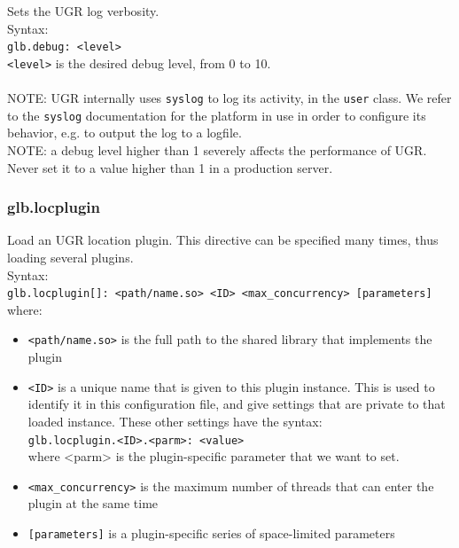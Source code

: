 \documentclass[12pt]{article} %
\begin{document}
 Sets the UGR log verbosity.\\
 
 Syntax:\\

\verb"glb.debug: <level>"\\

\verb"<level>" is the desired debug level, from 0 to 10.\\ \\
 NOTE: UGR internally uses \verb"syslog" to log its activity, in the \verb"user" class. We refer to the \verb"syslog" documentation for the platform in use in order to configure its behavior, e.g. to output the log to a logfile.\\
 
  NOTE: a debug level higher than 1 severely affects the performance of UGR. Never set it to a value higher than 1 in a production server.\\

\subsubsection{\label{glb.locplugin}glb.locplugin}

 Load an UGR location plugin. This directive can be specified many times, thus loading several plugins.\\
 
 Syntax:\\

\verb"glb.locplugin[]: <path/name.so> <ID> <max_concurrency> [parameters]"\\

where:

\begin{itemize}
\item \verb"<path/name.so>" is the full path to the shared library that implements the plugin
\item \verb"<ID>" is a unique name that is given to this plugin instance. This is used to identify it in this configuration file, and give settings that are private to that loaded instance. These other settings have the syntax:\\
      \verb"glb.locplugin.<ID>.<parm>: <value>"\\
     where <parm> is the plugin-specific parameter that we want to set.
\item \verb"<max_concurrency>" is the maximum number of threads that can enter the plugin at the same time
\item \verb"[parameters]" is a plugin-specific series of space-limited parameters
\end{itemize}
\end{document}
